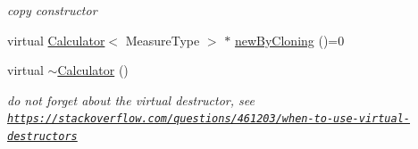\begin{DoxyCompactItemize}
\begin{DoxyCompactList}\small\item\em copy constructor \end{DoxyCompactList}\item 
virtual \hyperlink{class_ox_1_1_calculator}{Calculator}$<$ Measure\+Type $>$ $\ast$ \hyperlink{class_ox_1_1_calculator_aaec48f39f9b0ea1b622485cf25fba484}{new\+By\+Cloning} ()=0
\item 
virtual \hyperlink{class_ox_1_1_calculator_a0e0d0f525a80e54f17ab14e4073d780d}{$\sim$\+Calculator} ()\hypertarget{class_ox_1_1_calculator_a0e0d0f525a80e54f17ab14e4073d780d}{}\label{class_ox_1_1_calculator_a0e0d0f525a80e54f17ab14e4073d780d}

\begin{DoxyCompactList}\small\item\em do not forget about the virtual destructor, see \href{https://stackoverflow.com/questions/461203/when-to-use-virtual-destructors}{\tt https\+://stackoverflow.\+com/questions/461203/when-\/to-\/use-\/virtual-\/destructors} \end{DoxyCompactList}\end{DoxyCompactItemize}
